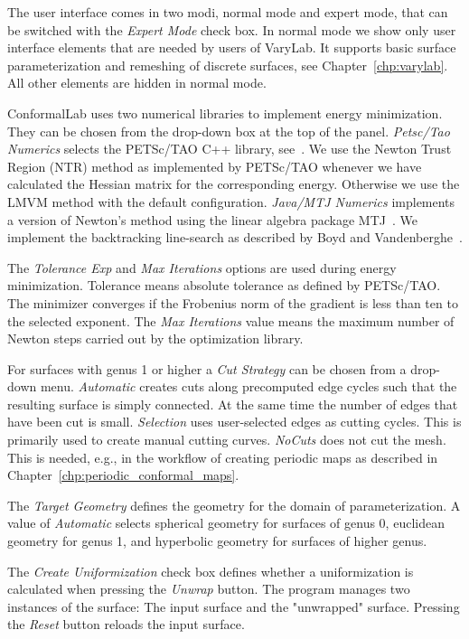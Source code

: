 \documentclass[Thesis.tex]{subfiles}
\begin{document}
The user interface comes in two modi, normal mode and expert mode, that can be switched with the \emph{Expert Mode} check box. 
In normal mode we show only user interface elements that are needed by users of {\sc VaryLab}.
It supports basic surface parameterization and remeshing of discrete surfaces, see Chapter~\ref{chp:varylab}. 
All other elements are hidden in normal mode.

{\sc ConformalLab} uses two numerical libraries to implement energy minimization. 
They can be chosen from the drop-down box at the top of the panel. 
\emph{Petsc/Tao Numerics} selects the {\sc PETSc/TAO} C++ library, see~\cite{petsc-web-page, tao-user-ref}. 
We use the Newton Trust Region (NTR) method as implemented by {\sc PETSc/TAO} whenever we have calculated the Hessian matrix for the corresponding energy. 
Otherwise we use the LMVM method with the default configuration. 
\emph{Java/MTJ Numerics} implements a version of Newton's method using the linear algebra package MTJ~\cite{mtj-website}. 
We implement the backtracking line-search as described by Boyd and Vandenberghe~\cite[pp.~464]{boyd2004convex}.

The \emph{Tolerance Exp} and \emph{Max Iterations} options are used during energy minimization. 
Tolerance means absolute tolerance as defined by {\sc PETSc/TAO}. 
The minimizer converges if the Frobenius norm of the gradient is less than ten to the selected exponent. The \emph{Max Iterations} value means the maximum number of Newton steps carried out by the optimization library.

For surfaces with genus 1 or higher a \emph{Cut Strategy} can be chosen from a drop-down menu. 
\emph{Automatic} creates cuts along precomputed edge cycles such that the resulting surface is simply connected. 
At the same time the number of edges that have been cut is small. 
\emph{Selection} uses user-selected edges as cutting cycles. 
This is primarily used to create manual cutting curves. 
\emph{NoCuts} does not cut the mesh. 
This is needed, e.g., in the workflow of creating periodic maps as described in Chapter~\ref{chp:periodic_conformal_maps}.

The \emph{Target Geometry} defines the geometry for the domain of parameterization. 
A value of \emph{Automatic} selects spherical geometry for surfaces of genus 0, euclidean geometry for genus 1, and hyperbolic geometry for surfaces of higher genus.

The \emph{Create Uniformization} check box defines whether a uniformization is calculated when pressing the \emph{Unwrap} button. 
The program manages two instances of the surface: The input surface and the "unwrapped" surface. Pressing the \emph{Reset} button reloads the input surface.
\end{document}
